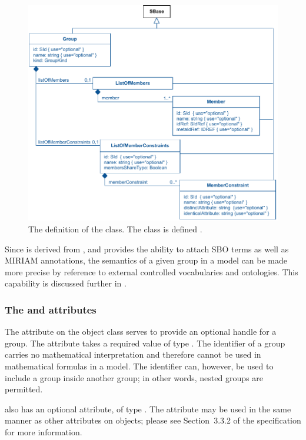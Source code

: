 \begin{figure}[t]
  \includegraphics{figs/group-uml}
  \caption{The definition of the \Group class.  The \Member class is defined .}
  \label{group-uml}
  \label{member-uml}
\end{figure}

Since \Group is derived from \SBase, and \SBase provides the ability to attach SBO terms as well as MIRIAM annotations, the semantics of a given group in a model can be made more precise by reference to external controlled vocabularies and ontologies.  This capability is discussed further in .


\subsubsection{The \fixttspace{} and \fixttspace{} attributes}

The  attribute on the \Group object class serves to provide an optional handle for a group.  The attribute takes a required value of type .  The identifier of a group carries no mathematical interpretation and therefore cannot be used in mathematical formulas in a model.  The identifier can, however, be used to include a group inside another group; in other words, nested groups are permitted.

\Group also has an optional  attribute, of type .  The  attribute may be used in the same manner as other  attributes on \sbmlthreecore objects; please see Section~3.3.2 of the \sbmlthreecore specification for more information.


